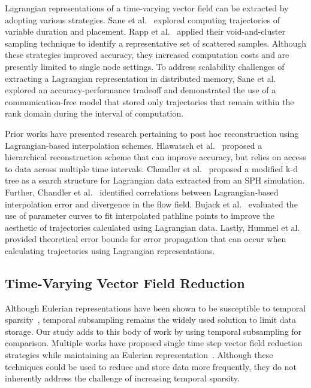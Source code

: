 Lagrangian representations of a time-varying vector field can be extracted by adopting various strategies.
%
Sane et al.~\cite{sane2019interpolation} explored computing trajectories of variable duration and placement. 
%
Rapp et al.~\cite{rapp2019void} applied their void-and-cluster sampling technique to identify a representative set of scattered samples.
%
Although these strategies improved accuracy, they increased computation costs and are presently limited to single node settings.
%
To address scalability challenges of extracting a Lagrangian representation in distributed memory, Sane et al.~\cite{sane2020scalable} explored an accuracy-performance tradeoff and demonstrated the use of a communication-free model that stored only trajectories that remain within the rank domain during the interval of computation.
%

Prior works have presented research pertaining to post hoc reconstruction using Lagrangian-based interpolation schemes.
%
Hlawatsch et al.~\cite{hlawatsch2011hierarchical} proposed a hierarchical reconstruction scheme that can improve accuracy, but relies on access to data across multiple time intervals.
%
Chandler et al.~\cite{chandler2015interpolation} proposed a modified k-d tree as a search structure for Lagrangian data extracted from an SPH simulation.
%
Further, Chandler et al.~\cite{chandler2016analysis} identified correlations between Lagrangian-based interpolation error and divergence in the flow field.
%
Bujack et al.~\cite{bujack2015lagrangian} evaluated the use of parameter curves to fit interpolated pathline points to improve the aesthetic of trajectories calculated using Lagrangian data.
%
Lastly, Hummel et al.~\cite{hummel2016error} provided theoretical error bounds for error propagation that can occur when calculating trajectories using Lagrangian representations. 
%

\vspace{-1mm}
\subsection{Time-Varying Vector Field Reduction}
%
Although Eulerian representations have been shown to be susceptible to temporal sparsity~\cite{costa2004lagrangian}\cite{Qin2014}\cite{agranovsky2014improved}\cite{sane2018revisiting}, temporal subsampling remains the widely used solution to limit data storage.
%
Our study adds to this body of work by using temporal subsampling for comparison.
%
Multiple works have proposed single time step vector field reduction strategies while maintaining an Eulerian representation~\cite{lodha2000topology}\cite{lodha2003topology}\cite{theisel2003combining}\cite{tong2012salient}.
%
Although these techniques could be used to reduce and store data more frequently, they do not inherently address the challenge of increasing temporal sparsity.
%

